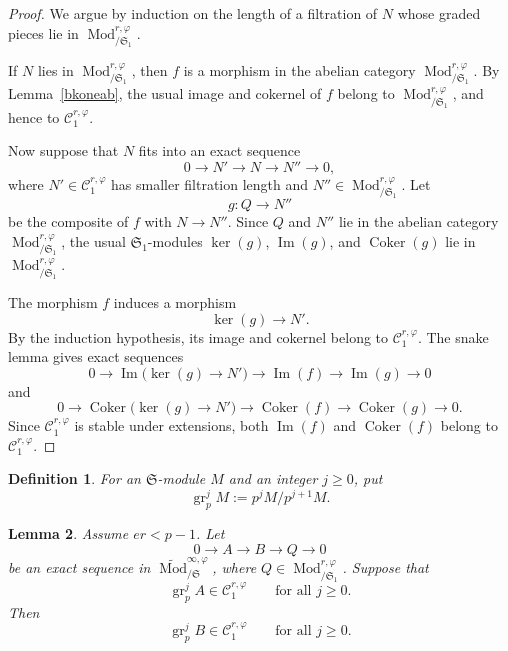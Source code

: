 \documentclass[11pt]{amsart}
\newtheorem{lemma}{Lemma}[section]
\newtheorem{definition}[lemma]{Definition}
\numberwithin{equation}{section}
\newcommand{\mf}{\mathfrak}
\newcommand{\Mod}{\operatorname{Mod}}
\newcommand{\im}{\operatorname{Im}}
\newcommand{\Coker}{\operatorname{Coker}}
\newcommand{\gr}{{\operatorname{gr}}}
\newcommand{\mS}{\mf{S}}
\numberwithin{equation}{section}
\begin{document}
\begin{proof}
We argue by induction on the length of a filtration of $N$ whose graded
pieces lie in $\Mod^{r,\varphi}_{/\mS_1}$.

If $N$ lies in $\Mod^{r,\varphi}_{/\mS_1}$, then $f$ is a morphism in the
abelian category $\Mod^{r,\varphi}_{/\mS_1}$.  By Lemma~\ref{bkoneab}, the
usual image and cokernel of $f$ belong to $\Mod^{r,\varphi}_{/\mS_1}$, and
hence to $\mathcal C_1^{r,\varphi}$.

Now suppose that $N$ fits into an exact sequence
\[
  0\longrightarrow N'\longrightarrow N\longrightarrow N''\longrightarrow 0,
\]
where $N'\in\mathcal C_1^{r,\varphi}$ has smaller filtration length and
$N''\in\Mod^{r,\varphi}_{/\mS_1}$.  Let
\[
  g:Q\longrightarrow N''
\]
be the composite of $f$ with $N\to N''$.  Since $Q$ and $N''$ lie in the
abelian category $\Mod^{r,\varphi}_{/\mS_1}$, the usual $\mS_1$-modules
$\ker(g)$, $\im(g)$, and $\Coker(g)$ lie in
$\Mod^{r,\varphi}_{/\mS_1}$.

The morphism $f$ induces a morphism
\[
  \ker(g)\longrightarrow N'.
\]
By the induction hypothesis, its image and cokernel belong to
$\mathcal C_1^{r,\varphi}$.  The snake lemma gives exact sequences
\[
  0\longrightarrow
  \im\bigl(\ker(g)\to N'\bigr)
  \longrightarrow
  \im(f)
  \longrightarrow
  \im(g)
  \longrightarrow 0
\]
and
\[
  0\longrightarrow
  \Coker\bigl(\ker(g)\to N'\bigr)
  \longrightarrow
  \Coker(f)
  \longrightarrow
  \Coker(g)
  \longrightarrow 0.
\]
Since $\mathcal C_1^{r,\varphi}$ is stable under extensions, both
$\im(f)$ and $\Coker(f)$ belong to $\mathcal C_1^{r,\varphi}$.
\end{proof}

\begin{definition}
For an $\mS$-module $M$ and an integer $j\geq 0$, put
\[
  \gr_p^j M:=p^jM/p^{j+1}M.
\]
\end{definition}

\begin{lemma}\label{grpextone}
Assume $er<p-1$.  Let
\[
  0\longrightarrow A\longrightarrow B\longrightarrow Q\longrightarrow 0
\]
be an exact sequence in $\widetilde{\Mod}^{\infty,\varphi}_{/\mS}$, where
$Q\in\Mod^{r,\varphi}_{/\mS_1}$.  Suppose that
\[
  \gr_p^j A\in\mathcal C_1^{r,\varphi}
  \qquad
  \text{for all } j\geq 0.
\]
Then
\[
  \gr_p^j B\in\mathcal C_1^{r,\varphi}
  \qquad
  \text{for all } j\geq 0.
\]
\end{lemma}
\end{document}
